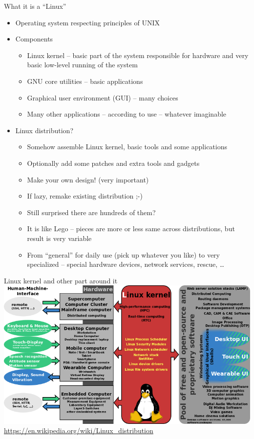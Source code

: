 \documentclass[compress, ucs, xelatex, 11pt, xcolor=svgnames,
  hyperref={
    bookmarks=true,
    unicode=true,
    colorlinks=true,
    pdftitle={Linux, command line and MetaCentrum},
    plainpages=false,
    pdfauthor={Vojtech Zeisek},
    pdfsubject={Course about use of Linux command line, writing shell scripts and using MetaCentrum of CESNET},
    pdfcreator={XeLaTeX},
    pdfkeywords={Linux, GNU, BASH, shell, command line, MetaCentrum},
    linkcolor=Red,
    anchorcolor=Blue,
    citecolor=Purple,
    filecolor=DodgerBlue,
    menucolor=DarkOrchid,
    urlcolor=DeepSkyBlue,
    pdftex},
  url={hyphens, lowtilde} %
  ]{beamer}
\begin{document}
\begin{frame}{What it is a ``Linux''}
\begin{itemize}
  \item Operating system respecting principles of UNIX
  \item Components
  \begin{itemize}
    \item Linux kernel -- basic part of the system responsible for hardware and very basic low-level running of the system
    \item GNU core utilities -- basic applications
    \item Graphical user environment (GUI) -- many choices
    \item Many other applications -- according to use -- whatever imaginable
  \end{itemize}
  \item Linux distribution?
  \begin{itemize}
    \item Somehow assemble Linux kernel, basic tools and some applications
    \item Optionally add some patches and extra tools and gadgets
    \item Make your own design! (very important)
    \item If lazy, remake existing distribution ;-)
    \item Still surprised there are hundreds of them?
    \item It is like Lego -- pieces are more or less same across distributions, but result is very variable
    \item From ``general'' for daily use (pick up whatever you like) to very specialized -- special hardware devices, network services, rescue, \ldots
  \end{itemize}
\end{itemize}
\end{frame}

\begin{frame}{Linux kernel and other part around it}
  \includegraphics[width=\textwidth]{linux_kernel_ubiquity.png}\\
  \url{https://en.wikipedia.org/wiki/Linux_distribution}
\end{frame}
\end{document}
